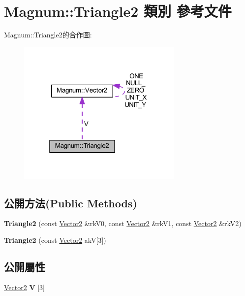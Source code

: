 \hypertarget{class_magnum_1_1_triangle2}{}\section{Magnum\+:\+:Triangle2 類別 參考文件}
\label{class_magnum_1_1_triangle2}


Magnum\+:\+:Triangle2的合作圖\+:\nopagebreak
\begin{figure}[H]
\begin{center}
\leavevmode
\includegraphics[width=229pt]{class_magnum_1_1_triangle2__coll__graph}
\end{center}
\end{figure}
\subsection*{公開方法(Public Methods)}
\begin{DoxyCompactItemize}
\item 
{\bfseries Triangle2} (const \hyperlink{class_magnum_1_1_vector2}{Vector2} \&rk\+V0, const \hyperlink{class_magnum_1_1_vector2}{Vector2} \&rk\+V1, const \hyperlink{class_magnum_1_1_vector2}{Vector2} \&rk\+V2)\hypertarget{class_magnum_1_1_triangle2_a4a648aacf911a6b8154a1bfe6f0f5c97}{}\label{class_magnum_1_1_triangle2_a4a648aacf911a6b8154a1bfe6f0f5c97}

\item 
{\bfseries Triangle2} (const \hyperlink{class_magnum_1_1_vector2}{Vector2} akV\mbox{[}3\mbox{]})\hypertarget{class_magnum_1_1_triangle2_a9d2f301436f48f4201833731b9652128}{}\label{class_magnum_1_1_triangle2_a9d2f301436f48f4201833731b9652128}

\end{DoxyCompactItemize}
\subsection*{公開屬性}
\begin{DoxyCompactItemize}
\item 
\hyperlink{class_magnum_1_1_vector2}{Vector2} {\bfseries V} \mbox{[}3\mbox{]}\hypertarget{class_magnum_1_1_triangle2_afab0b18375e0c1485c390289245e011f}{}\label{class_magnum_1_1_triangle2_afab0b18375e0c1485c390289245e011f}

\end{DoxyCompactItemize}


